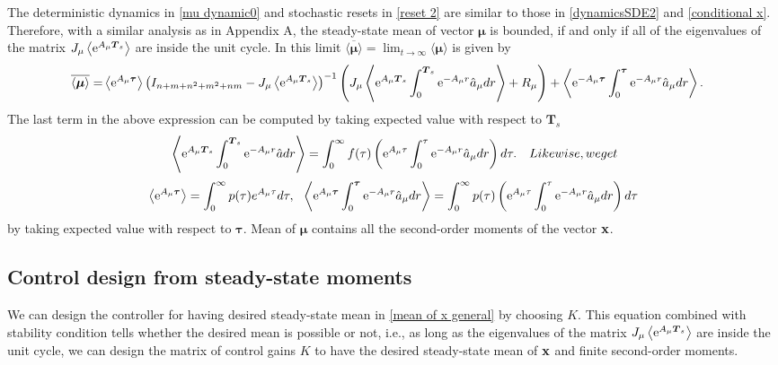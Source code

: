 \documentclass[letterpaper, 10 pt,one column, conference]{ieeeconf}  %
\begin{document}
The deterministic dynamics in \eqref{mu dynamic0} and stochastic resets in \eqref{reset 2} are similar to those in \eqref{dynamicsSDE2} and \eqref{conditional x}. Therefore, with a similar analysis as in Appendix A, the steady-state mean of vector $\boldsymbol \mu$ is bounded, if and only if all of the eigenvalues of the matrix $J_\mu \left\langle  {\rm e}^{ A_\mu \boldsymbol T_s} \right \rangle$ are inside the unit cycle. In this limit $\overline{\langle \boldsymbol \mu \rangle} =\lim_{t\to\infty}\langle \boldsymbol \mu \rangle$ is given by
	\begin{equation}
	\begin{aligned}
	\overline{\langle {\boldsymbol{\mu}} \rangle} =  & \left\langle {\rm e}^{ A_\mu\boldsymbol \tau} \right \rangle \left(I_{n+m+n^2+m^2+nm} -J_\mu\left\langle {\rm e}^{ A_\mu \boldsymbol T_s} \right \rangle   \right)^{-1} \left(J_\mu \left \langle  {\rm e}^{ A_\mu\boldsymbol T_s} \int_0^{\boldsymbol T_s}  {\rm e}^{ -A_\mu r} \hat{a}_\mu dr  \right \rangle+R_\mu\right)  + \left \langle {\rm e}^{ -A_\mu \boldsymbol \tau}  \int_0^{\boldsymbol \tau}  {\rm e}^{ -A_\mu r} \hat{a}_\mu dr  \right \rangle .
	\label{mean of x2}	
	\end{aligned}
	\end{equation} 
The last term in the above expression can be computed by taking expected value with respect to $\boldsymbol T_s$
\begin{equation}\begin{aligned}
&	\left \langle  {\rm e}^{ A_\mu\boldsymbol T_s} \int_0^{\boldsymbol T_s}  {\rm e}^{ -A_\mu r} \hat{a} dr  \right \rangle  =  \int_0^{\infty} f(\tau )\left( {\rm e}^{ A_\mu\tau } \int_0^{\tau }  {\rm e}^{ -A_\mu r} \hat{a}_\mu dr \right)  d \tau .
	\end{aligned}
Likewise, we get	
	\end{equation}
		\begin{align}
 \left\langle  {\rm e}^{ A_\mu \boldsymbol \tau } \right \rangle =  \int_0^{\infty}p(\tau) e^{A_\mu \tau }d \tau,  \ \  \left \langle  {\rm e}^{ A_\mu \boldsymbol \tau } \int_0^{\boldsymbol \tau }  {\rm e}^{ -A_\mu r} \hat{a}_\mu dr  \right \rangle  =  \int_0^{\infty} p(\tau )\left( {\rm e}^{ A_\mu\tau } \int_0^{\tau }  {\rm e}^{ -A_\mu r} \hat{a}_\mu dr \right)  d \tau 
		\end{align}
by taking expected value with respect to $\boldsymbol \tau$. Mean of $\boldsymbol \mu$ contains all the second-order moments of the vector $\bold x$.


\subsection{Control design from steady-state moments}
We can design the controller for having desired steady-state mean in \eqref{mean of x general} by choosing $K$.
This equation combined with stability condition tells whether the desired mean is possible or not, i.e., as long as the eigenvalues of the matrix $J_\mu \left\langle  {\rm e}^{ A_\mu \boldsymbol T_s} \right \rangle$ are inside the unit cycle, we can design the matrix of control gains $K$ to have the desired steady-state mean of $\bold x$ and finite second-order moments.
\end{document}
